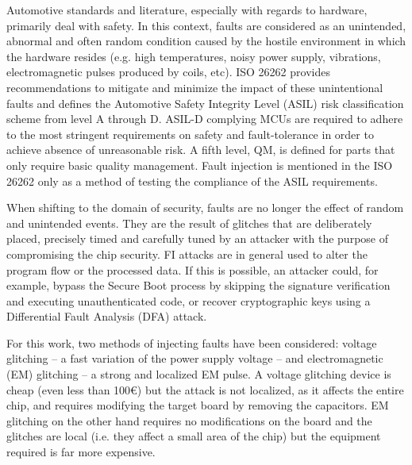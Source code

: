 \documentclass[a4paper, 10pt]{article}
\begin{document}
Automotive standards and literature, especially with regards to hardware, primarily deal with safety. In this context, faults are considered as an unintended, abnormal and often random condition caused by the hostile environment in which the hardware resides (e.g. high temperatures, noisy power supply, vibrations, electromagnetic pulses produced by coils, etc). ISO 26262 provides recommendations to mitigate and minimize the impact of these unintentional faults and defines the Automotive Safety Integrity Level (ASIL) risk classification scheme from level A through D. ASIL-D complying MCUs are required to adhere to the most stringent requirements on safety and fault-tolerance in order to achieve absence of unreasonable risk. A fifth level, QM, is defined for parts that only require basic quality management. Fault injection is mentioned in the ISO 26262 only as a method of testing the compliance of the ASIL requirements.  


When shifting to the domain of security, faults are no longer the effect of random and unintended events. They are the result of glitches that are deliberately placed, precisely timed and carefully tuned by an attacker with the purpose of compromising the chip security. FI attacks are in general used to alter the program flow or the processed data. If this is possible, an attacker could, for example, bypass the Secure Boot process by skipping the signature verification and executing unauthenticated code, or recover cryptographic keys using a Differential Fault Analysis (DFA) attack. 

For this work, two methods of injecting faults have been considered: voltage glitching -- a fast variation of the power supply voltage -- and electromagnetic (EM) glitching -- a strong and localized EM pulse. A voltage glitching device is cheap (even less than 100€) but the attack is not localized, as it affects the entire chip, and requires modifying the target board by removing the capacitors. EM glitching on the other hand requires no modifications on the board and the glitches are local (i.e. they affect a small area of the chip) but the equipment required is far more expensive. 

\end{document}
